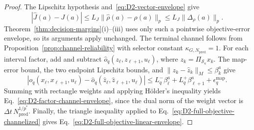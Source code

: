 \begin{proof}
The Lipschitz hypothesis and~\eqref{eq:D2-vector-envelope} give
\[
  |\hat J(a)-J(a)|
  \leq L_J\|\hat\rho(a)-\rho(a)\|_p
  \leq L_J\|\Delta_\rho(a)\|_p.
\]
Theorem~\ref{thm:decision-margins}(i)--(iii) uses only such a pointwise
objective-error envelope, so its arguments apply unchanged. The terminal
channel follows from Proposition~\ref{prop:channel-reliability} with selector
constant $\kappa_{G,{N_{\mathrm{pred}}}}=1$.
For each interval factor, add and subtract
$\hat o_q(z_\ell,z_{\ell+1},u_\ell)$, where
$z_k=\Pi_{\mathcal S_\kappa}x_k$. The map-error bound, the two endpoint
Lipschitz bounds, and $\|z_k-\hat z_k\|_M\le\beta_k^a$ give
\[
 |o_q(x_\ell,x_{\ell+1},u_\ell)
    -\hat o_q(\hat z_\ell,\hat z_{\ell+1},u_\ell)|
 \le L_q^-\beta_\ell^a+L_q^+\beta_{\ell+1}^a
       +\epsilon_q^{\mathrm{map}}.
\]
Summing with rectangle weights and applying H\"older's inequality yields
Eq.~\eqref{eq:D2-factor-channel-envelope}, since the dual norm of the
weight vector is $\Delta t\,N_{\mathrm{pred}}^{1/p^\ast}$.
Finally, the triangle inequality applied to
Eq.~\eqref{eq:D2-full-objective-channelized} gives
Eq.~\eqref{eq:D2-full-objective-linear-envelope}.
\end{proof}

